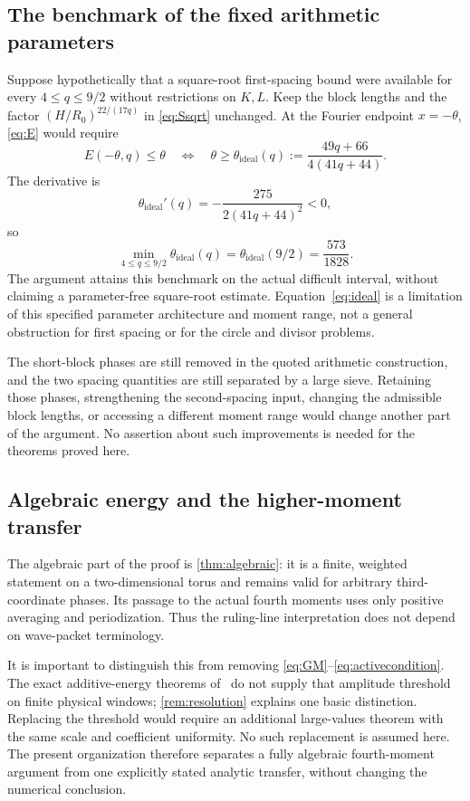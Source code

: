 \documentclass[11pt,reqno]{amsart}
\numberwithin{equation}{section}
\theoremstyle{definition}
\theoremstyle{remark}
\begin{document}
\subsection{The benchmark of the fixed arithmetic parameters}
Suppose hypothetically that a square-root first-spacing bound were available for every $4\le q\le9/2$ without restrictions on $K,L$.
Keep the block lengths and the factor $(H/R_0)^{22/(17q)}$ in \eqref{eq:Ssqrt} unchanged.
At the Fourier endpoint $x=-\theta$, \eqref{eq:E} would require
\[
 E(-\theta,q)\le\theta
 \quad\Longleftrightarrow\quad
 \theta\ge\theta_{\mathrm{ideal}}(q)
 :=\frac{49q+66}{4(41q+44)}.
\]
The derivative is
\[
 \theta_{\mathrm{ideal}}'(q)
 =-\frac{275}{2(41q+44)^2}<0,
\]
so
\begin{equation}\label{eq:ideal}
 \min_{4\le q\le9/2}\theta_{\mathrm{ideal}}(q)
 =\theta_{\mathrm{ideal}}(9/2)=\frac{573}{1828}.
\end{equation}
The argument attains this benchmark on the actual difficult interval, without claiming a parameter-free square-root estimate.
Equation~\eqref{eq:ideal} is a limitation of this specified parameter architecture and moment range, not a general obstruction for first spacing or for the circle and divisor problems.

The short-block phases are still removed in the quoted arithmetic construction, and the two spacing quantities are still separated by a large sieve.
Retaining those phases, strengthening the second-spacing input, changing the admissible block lengths, or accessing a different moment range would change another part of the argument.
No assertion about such improvements is needed for the theorems proved here.

\subsection{Algebraic energy and the higher-moment transfer}
The algebraic part of the proof is \cref{thm:algebraic}: it is a finite, weighted statement
on a two-dimensional torus and remains valid for arbitrary third-coordinate phases.
Its passage to the actual fourth moments uses only positive averaging and periodization.
Thus the ruling-line interpretation does not depend on wave-packet terminology.

It is important to distinguish this from removing \eqref{eq:GM}--\eqref{eq:activecondition}.
The exact additive-energy theorems of~\cite{JW,HuEnergy} do not supply that amplitude
threshold on finite physical windows; \cref{rem:resolution} explains one basic distinction.
Replacing the threshold would require an additional large-values theorem with the same
scale and coefficient uniformity. No such replacement is assumed here.
The present organization therefore separates a fully algebraic fourth-moment argument
from one explicitly stated analytic transfer, without changing the numerical conclusion.
\end{document}
